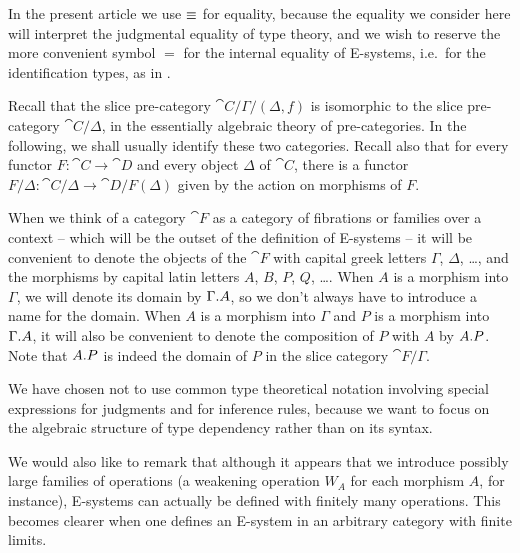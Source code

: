 \documentclass{article}
\begin{document}
\begin{rmk}
In the present article we use $\equiv$ for equality, because the equality we
consider here will interpret the judgmental equality of type theory, 
and we wish to reserve
the more convenient symbol $=$ for the internal equality of E-systems, i.e.~for
the identification types, as in \cite{TheBook}. 
\end{rmk}

\begin{rmk}
Recall that the slice pre-category $\cat{C}/\Gamma/(\Delta,f)$ is isomorphic to the slice pre-category
$\cat{C}/\Delta$, in the essentially algebraic theory of pre-categories. In the following,
we shall usually identify these two categories. Recall also that for every functor
$F:\cat{C}\to\cat{D}$ and every object $\Delta$ of $\cat{C}$, there is a functor
$F/\Delta:\cat{C}/\Delta\to \cat{D}/F(\Delta)$ given by the action on morphisms of $F$. 
\end{rmk}

\begin{rmk}
When we think of a category $\cat{F}$ as a category of fibrations or families
over a context -- which will be the outset of the definition of E-systems --
it will be convenient to denote the objects of the $\cat{F}$ with capital
greek letters $\Gamma$, $\Delta$, \ldots, and the morphisms by capital latin letters
$A$, $B$, $P$, $Q$, \ldots. When $A$ is a morphism into $\Gamma$, we will denote
its domain by $\ctxext{\Gamma}{A}$, so we don't always have to introduce a name
for the domain. When $A$ is a morphism into $\Gamma$ and
$P$ is a morphism into $\ctxext{\Gamma}{A}$, it will also be convenient to denote the
composition of $P$ with $A$ by $\ctxext{A}{P}$. Note that $\ctxext{A}{P}$
is indeed the domain of $P$ in the slice category $\cat{F}/\Gamma$.
\end{rmk}

\begin{rmk}
We have chosen not to use common type theoretical notation involving special
expressions for judgments and for inference rules, because we want to focus
on the algebraic structure of type dependency rather than on its syntax.

We would also like to remark that although it appears that we introduce possibly
large families of operations (a weakening operation $W_A$ for each morphism $A$,
for instance), E-systems can actually be defined with finitely many
operations. This becomes clearer when one defines an E-system in an arbitrary
category with finite limits.
\end{rmk}
\end{document}
